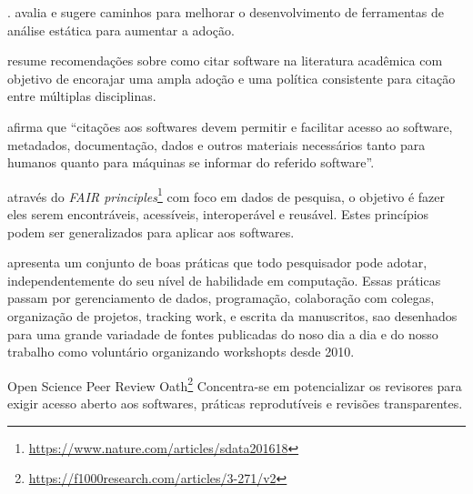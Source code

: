 .  avalia e sugere caminhos para melhorar o
desenvolvimento de ferramentas de análise estática para aumentar a adoção.

 resume recomendações sobre como citar software
na literatura acadêmica com objetivo de encorajar uma ampla adoção e uma
política consistente para citação entre múltiplas disciplinas.

 afirma que ``citações aos softwares devem
permitir e facilitar acesso ao software, metadados, documentação, dados e
outros materiais necessários tanto para humanos quanto para máquinas se
informar do referido software''.

 através do {\it FAIR
principles}\footnote{\url{https://www.nature.com/articles/sdata201618}} com
foco em dados de pesquisa, o objetivo é fazer eles serem encontráveis,
acessíveis, interoperável e reusável. Estes princípios podem ser generalizados
para aplicar aos softwares.

 apresenta um conjunto de boas práticas que todo
pesquisador pode adotar, independentemente do seu nível de habilidade em
computação. Essas práticas passam por gerenciamento de dados, programação,
colaboração com colegas, organização de projetos, tracking work, e escrita da
manuscritos, sao desenhados para uma grande variadade de fontes publicadas do
noso dia a dia e do nosso trabalho como voluntário organizando workshopts desde
2010.

Open Science Peer Review Oath\footnote{\url{https://f1000research.com/articles/3-271/v2}}
Concentra-se em potencializar os revisores para exigir acesso aberto aos
softwares, práticas reprodutíveis e revisões transparentes.

